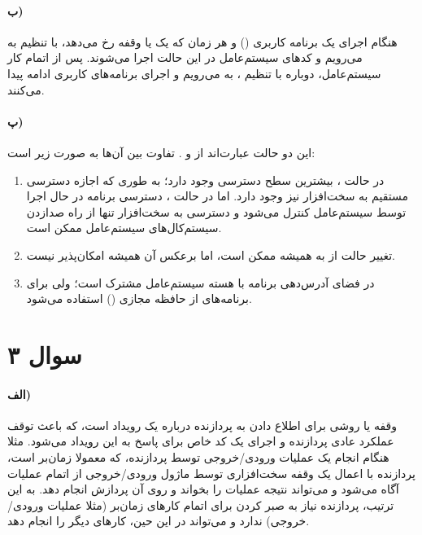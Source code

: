 \documentclass{article}
\begin{document}
	\paragraph*{ب)}
	هنگام اجرای یک برنامه کاربری
	()
	و هر زمان که یک
	یا وقفه رخ می‌دهد، با تنظیم
	به
	می‌رویم و کدهای سیستم‌عامل در این حالت اجرا می‌شوند.
	پس از اتمام کار سیستم‌عامل، دوباره با تنظیم
	،
	به
	می‌رویم و اجرای برنامه‌های کاربری ادامه پیدا می‌کنند.

	\paragraph*{پ)}
	این دو حالت عبارت‌اند از
	و
	.
	تفاوت بین آن‌ها به صورت زیر است:

	\begin{enumerate}
		\item
		در حالت
		،
		بیشترین سطح دسترسی وجود دارد؛ به طوری که اجازه دسترسی مستقیم به سخت‌افزار نیز وجود دارد. اما در حالت
		،
		دسترسی برنامه در حال اجرا توسط سیستم‌عامل کنترل می‌شود و دسترسی به سخت‌افزار تنها از راه صدازدن سیستم‌کال‌های سیستم‌عامل ممکن است.

		\item
		تغییر حالت از
		به
		همیشه ممکن است، اما برعکس آن همیشه امکان‌پذیر نیست.

		\item
		در
		فضای آدرس‌دهی برنامه با هسته سیستم‌عامل مشترک است؛ ولی برای برنامه‌های
		از حافظه مجازی
		()
		استفاده می‌شود.
	\end{enumerate}

	\section*{سوال ۳}

	\paragraph*{الف)}
	وقفه یا
	روشی برای اطلاع دادن به پردازنده درباره یک رویداد است، که باعث توقف عملکرد عادی پردازنده و اجرای یک کد خاص برای پاسخ به این رویداد می‌شود. مثلا هنگام انجام یک عملیات ورودی/خروجی توسط پردازنده، که معمولا زمان‌بر است، پردازنده با اعمال یک وقفه سخت‌افزاری توسط ماژول ورودی/خروجی از اتمام عملیات آگاه می‌شود و می‌تواند نتیجه عملیات را بخواند و روی آن پردازش انجام دهد. به این ترتیب، پردازنده نیاز به صبر کردن برای اتمام کارهای زمان‌بر (مثلا عملیات ورودی/خروجی) ندارد و می‌تواند در این حین، کارهای دیگر را انجام دهد.
\end{document}
